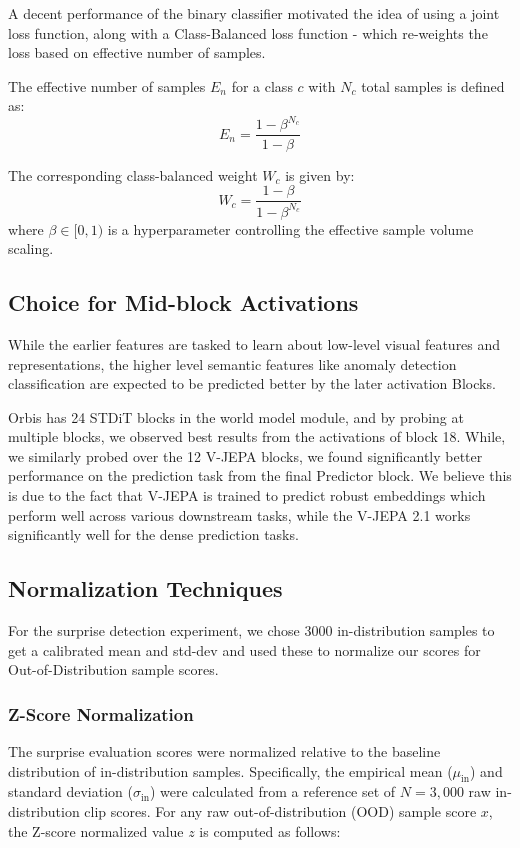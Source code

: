 \documentclass{article}
\begin{document}
A decent performance of the binary classifier motivated the idea of using a joint loss function, along with a Class-Balanced loss function - which re-weights the loss based on effective number of samples.

The effective number of samples $E_n$ for a class $c$ with $N_c$ total samples is defined as:
\begin{equation}
    E_n = \frac{1 - \beta^{N_c}}{1 - \beta}
\end{equation}

The corresponding class-balanced weight $W_c$ is given by:
\begin{equation}
    W_c = \frac{1 - \beta}{1 - \beta^{N_c}}
\end{equation}
where $\beta \in [0, 1)$ is a hyperparameter controlling the effective sample volume scaling.

\subsection{Choice for Mid-block Activations}

While the earlier features are tasked to learn about low-level visual features and representations, the higher level semantic features like anomaly detection classification are expected to be predicted better by the later activation Blocks.

Orbis has 24 STDiT blocks in the world model module, and by probing at multiple blocks, we observed best results from the activations of block 18. While, we similarly probed over the 12 V-JEPA blocks, we found significantly better performance on the prediction task from the final Predictor block. We believe this is due to the fact that V-JEPA is trained to predict robust embeddings which perform well across various downstream tasks, while the V-JEPA 2.1 works significantly well for the dense prediction tasks.


\subsection{Normalization Techniques}

For the surprise detection experiment, we chose 3000 in-distribution samples to get a calibrated mean and std-dev and used these to normalize our scores for Out-of-Distribution sample scores.

\subsubsection{Z-Score Normalization}
The surprise evaluation scores were normalized relative to the baseline distribution of in-distribution samples. Specifically, the empirical mean ($\mu_{\text{in}}$) and standard deviation ($\sigma_{\text{in}}$) were calculated from a reference set of $N = 3,000$ raw in-distribution clip scores. For any raw out-of-distribution (OOD) sample score $x$, the Z-score normalized value $z$ is computed as follows:
\end{document}
